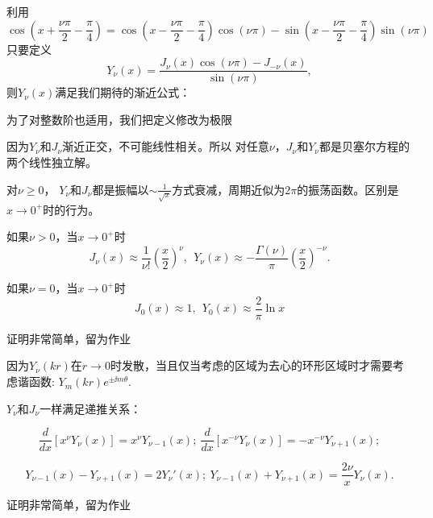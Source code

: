 \documentclass[CJK]{beamer}
\begin{document}
\begin{frame}
\bch
利用
{\small
$$ \cos{\left(x+\frac{\nu \pi}{2}-\frac{\pi}{4}\right)} = \cos{\left(x-\frac{\nu \pi}{2}-\frac{\pi}{4}\right)}\cos{(\nu\pi)} -  \sin{\left(x-\frac{\nu \pi}{2}-\frac{\pi}{4}\right)}\sin{(\nu\pi)} $$}
只要定义
$$Y_\nu(x) = \frac{J_\nu(x)\cos{(\nu\pi)} - J_{-\nu}(x)}{\sin{(\nu\pi)}},$$
则$Y_\nu(x)$满足我们期待的渐近公式：

\ech
\end{frame}

\begin{frame}
\bch
为了对整数阶也适用，我们把定义修改为极限

\skiplines

因为$Y_\nu$和$J_\nu$渐近正交，不可能线性相关。所以
{\blue
对任意$\nu $，$J_\nu$和$Y_\nu$都是贝塞尔方程的两个线性独立解。}
\ech
\end{frame}


\begin{frame}
\bch
{}
\ech
\end{frame}


\begin{frame}
\bch
对$\nu\ge 0$， $Y_\nu$和$J_\nu$都是振幅以$\sim \frac{1}{\sqrt{x}}$方式衰减，周期近似为$2\pi$的振荡函数。区别是$x\rightarrow 0^+$时的行为。

如果$\nu>0$，当$x\rightarrow 0^+$时
$$J_\nu(x)\approx \frac{1}{\nu !}\left(\frac{x}{2}\right)^\nu,\ \ Y_\nu(x) \approx -\frac{\Gamma(\nu)}{\pi}\left(\frac{x}{2}\right)^{-\nu}. $$

\skiplines

如果$\nu = 0$，当$x\rightarrow 0^+$时
$$J_0(x)\approx 1 , \ \ Y_0(x) \approx \frac{2}{\pi}\ln x $$

证明非常简单，留为作业\bye

{\blue 因为$Y_\nu(kr)$在$r\rightarrow 0$时发散，当且仅当考虑的区域为去心的环形区域时才需要考虑谐函数: $Y_m(kr)e^{\pm \ii m\theta}$.}
\ech
\end{frame}

\begin{frame}
\bch
$Y_\nu$和$J_\nu$一样满足递推关系：
{\blue
  $$ \frac{d}{dx}\left[x^\nu Y_\nu(x)\right] = x^\nu Y_{\nu -1}(x);\ \frac{d}{dx}\left[x^{-\nu} Y_\nu(x)\right] = -x^{-\nu} Y_{\nu +1}(x);  $$

  $$ Y_{\nu-1}(x)-Y_{\nu+1}(x) =2Y_\nu'(x) ;\  Y_{\nu-1}(x)+Y_{\nu+1}(x) = \frac{2\nu}{x}Y_\nu(x).$$}

证明非常简单，留为作业\bye
\ech
\end{frame}
\end{document}

